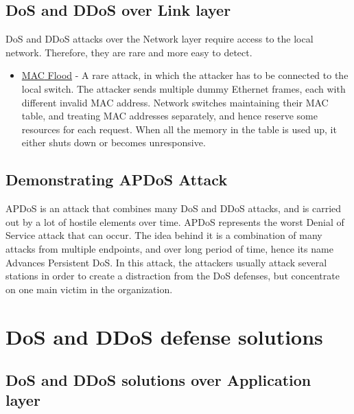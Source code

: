 \documentclass{report}
\begin{document}
\subsection {DoS and DDoS over Link layer}  

 \hfill \break \gls{DoS} and \gls{DDoS} attacks over the Network layer require access to the local network. Therefore, they are rare and more easy to detect.
\begin{itemize}
\item\underline{\gls{MAC} Flood} - A rare attack, in which the attacker has to be connected to the local switch. The attacker sends multiple dummy Ethernet frames, each with different invalid \gls{MAC} address. Network switches maintaining their \gls{MAC} table, and treating \gls{MAC} addresses separately, and hence reserve some resources for each request. When all the memory in the table is used up, it either shuts down or becomes unresponsive.
\end{itemize}


 \hfill \break
\subsection {Demonstrating APDoS Attack}

 \hfill \break  \gls{APDoS} is an attack that combines many \gls{DoS} and \gls{DDoS} attacks, and is carried out by a lot of hostile elements over time. \gls{APDoS} represents the worst Denial of Service attack that can occur. The idea behind it is a combination of many attacks from multiple endpoints, and over long period of time, hence its name Advances Persistent \gls{DoS}. In this attack, the attackers usually attack several stations in order to create a distraction from the \gls{DoS} defenses, but concentrate on one main victim in the organization.
\newpage
\section{DoS and DDoS defense solutions }

\subsection{DoS and DDoS solutions over Application layer}
 
\end{document}
